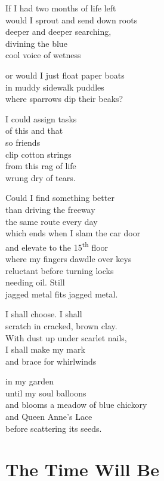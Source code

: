 \documentclass[twoside,10pt]{book}
\begin{document}
If I had two months of life left\\
would I sprout and send down roots\\
deeper and deeper searching,\\
divining the blue\\
cool voice of wetness

or would I just float paper boats\\
in muddy sidewalk puddles\\
where sparrows dip their beaks?

I could assign tasks\\
of this and that\\
so friends\\
clip cotton strings\\
from this rag of life\\
wrung dry of tears.

Could I find something better\\
than driving the freeway\\
the same route every day\\
which ends when I slam the car door\\
and elevate to the 15\textsuperscript{th} floor\\
where my fingers dawdle over keys\\
reluctant before turning locks\\
needing oil. Still\\
jagged metal fits jagged metal.

I shall choose. I shall\\
scratch in cracked, brown clay.\\
With dust up under scarlet nails,\\
I shall make my mark\\
and brace for whirlwinds

in my garden\\
until my soul balloons\\
and blooms a meadow of blue chickory\\
and Queen Anne's Lace\\
before scattering its seeds.


\clearpage
\section{The Time Will Be}
\end{document}
